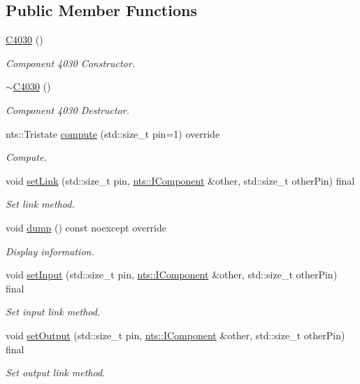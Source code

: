 \subsection*{Public Member Functions}
\begin{DoxyCompactItemize}
\item 
\mbox{\hyperlink{classC4030_a4451260ff546d7daeefe6ea4ee2e877a}{C4030}} ()
\begin{DoxyCompactList}\small\item\em Component 4030 Constructor. \end{DoxyCompactList}\item 
\mbox{\label{classC4030_a7c009fc75d3613b226f077dc96a1f26e}} 
\mbox{\hyperlink{classC4030_a7c009fc75d3613b226f077dc96a1f26e}{$\sim$\+C4030}} ()
\begin{DoxyCompactList}\small\item\em Component 4030 Destructor. \end{DoxyCompactList}\item 
nts\+::\+Tristate \mbox{\hyperlink{classC4030_aa07ec80804c8109854c59da91c7ec636}{compute}} (std\+::size\+\_\+t pin=1) override
\begin{DoxyCompactList}\small\item\em Compute. \end{DoxyCompactList}\item 
void \mbox{\hyperlink{classC4030_ab6286489fdf747bc863223863e961a40}{set\+Link}} (std\+::size\+\_\+t pin, \mbox{\hyperlink{classnts_1_1IComponent}{nts\+::\+I\+Component}} \&other, std\+::size\+\_\+t other\+Pin) final
\begin{DoxyCompactList}\small\item\em Set link method. \end{DoxyCompactList}\item 
void \mbox{\hyperlink{classC4030_a55726374b18c0def739d5f25b19fe6c2}{dump}} () const noexcept override
\begin{DoxyCompactList}\small\item\em Display information. \end{DoxyCompactList}\item 
void \mbox{\hyperlink{classC4030_aa857c9828b1642c371976aaa01db4b74}{set\+Input}} (std\+::size\+\_\+t pin, \mbox{\hyperlink{classnts_1_1IComponent}{nts\+::\+I\+Component}} \&other, std\+::size\+\_\+t other\+Pin) final
\begin{DoxyCompactList}\small\item\em Set input link method. \end{DoxyCompactList}\item 
void \mbox{\hyperlink{classC4030_a233e02d922356fc378b6c9c807ce2e02}{set\+Output}} (std\+::size\+\_\+t pin, \mbox{\hyperlink{classnts_1_1IComponent}{nts\+::\+I\+Component}} \&other, std\+::size\+\_\+t other\+Pin) final
\begin{DoxyCompactList}\small\item\em Set output link method. \end{DoxyCompactList}\end{DoxyCompactItemize}
